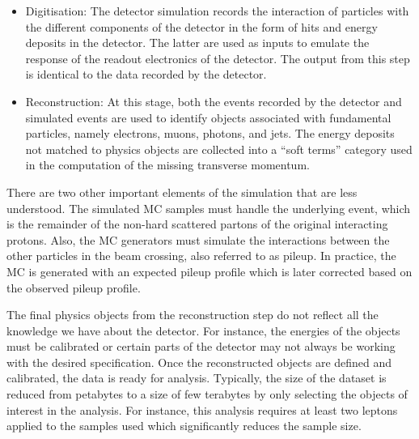 \begin{itemize}
\item Digitisation: The detector simulation records the interaction of particles with the different components of the detector in the form of hits and energy deposits in the detector.
  The latter are used as inputs to emulate the response of the readout electronics of the detector. The output from this step is identical to the data recorded by the detector.
\item Reconstruction: At this stage, both the events recorded by the detector and simulated events are used to identify objects associated with fundamental particles, namely 
  electrons, muons, photons, and jets. The energy deposits not matched to physics objects are collected into a ``soft terms'' category used in the computation of the missing transverse momentum.  
\end{itemize} 

There are two other important elements of the simulation that are less understood. The simulated MC samples must handle the underlying event, which is the remainder of the non-hard scattered partons of 
the original interacting protons. Also, the MC generators must simulate the interactions between the other particles in the beam crossing, also referred to as pileup. In practice, 
the MC is generated with an expected pileup profile which is later corrected based on the observed pileup profile.


The final physics objects from the reconstruction step do not reflect all the knowledge we have about the detector. For instance, the energies of the objects must be calibrated
or certain parts of the detector may not always be working with the desired specification. 
 Once the reconstructed objects are defined and calibrated, the data is ready for analysis. Typically, the size of the dataset is reduced from petabytes to a size of few terabytes
  by only selecting the objects of interest in the analysis. For instance, this analysis requires at least two leptons applied to the samples used which significantly reduces the sample size.
